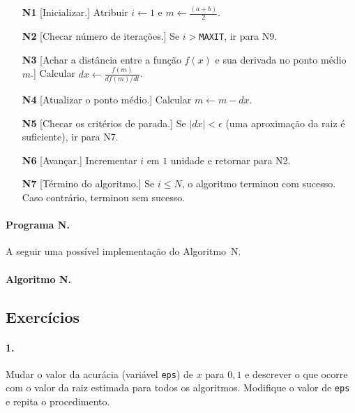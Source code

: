 \begin{itemize}
\item[\bf N1] [Inicializar.] Atribuir $i \leftarrow 1$ e 
	$m\leftarrow\frac{(a+b)}{2}$.
\item[\bf N2] [Checar número de iterações.] Se $i>${\tt MAXIT}, 
		ir para N9.

	\item[\bf N3] [Achar a distância entre a função $f(x)$ e sua derivada no ponto médio $m$.]
		Calcular $dx\leftarrow\frac{f(m)}{df(m)/dt}$.

	\item[\bf N4] [Atualizar o ponto médio.]
	Calcular $m\leftarrow m-dx$.

\item[\bf N5] [Checar os critérios de parada.] Se 
	\hbox{$|dx| < \epsilon$} (uma aproximação da
	raiz é suficiente), ir para N7.

\item[\bf N6] [Avançar.] Incrementar $i$ em $1$ unidade e
	retornar para N2.

\item[\bf N7] [Término do algoritmo.] Se $i\leq N$, o algoritmo
	terminou com sucesso. Caso contrário, terminou 
	sem sucesso.\quad\pfbox
\end{itemize}

\pagebreak

\paragraph{Programa N.} A seguir uma possível implementação 
do Algoritmo~N.

\paragraph{Algoritmo N.}


\subsection*{Exercícios}

\paragraph{1.} Mudar o valor da acurácia (variável {\tt eps}) de $x$ para $0,1$ e
descrever o que ocorre com o valor da raiz estimada para todos 
os algoritmos. Modifique o valor de {\tt eps} e repita o procedimento.

